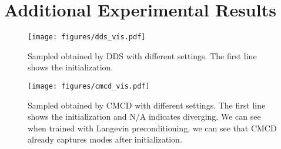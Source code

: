 \documentclass{article} %
\begin{document}
\section{Additional Experimental Results}\label{appendix:visualize}
\newpage
\begin{figure}[H]
    \centering
    \texttt{[image: figures/dds\_vis.pdf]}
    \caption{Sampled obtained by DDS with different settings.
    The first line shows the initialization. }
\end{figure}
\begin{figure}[H]
    \centering
    \texttt{[image: figures/cmcd\_vis.pdf]}
    \caption{Sampled obtained by CMCD with different settings.
    The first line shows the initialization and N/A indicates diverging. 
    We can see when trained with Langevin preconditioning, we can see that CMCD already captures modes after initialization.}
\end{figure}
\end{document}
